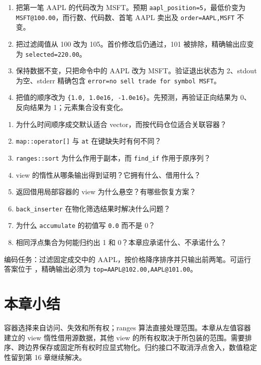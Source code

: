 \begin{enumerate}
  \item 把第一笔 AAPL 的代码改为 MSFT。预期 \texttt{aapl\_position=5}，最低价变为 \texttt{MSFT@100.00}，而行数、代码数、首笔 AAPL 卖出及 \texttt{order=AAPL,MSFT} 不变。
  \item 把过滤阈值从 100 改为 105。首价修改后仍通过，101 被排除，精确输出应变为 \texttt{selected=220.00}。
  \item 保持数据不变，只把命令中的 AAPL 改为 MSFT。验证退出状态为 2、stdout 为空、stderr 精确包含 \texttt{error=no sell trade for symbol MSFT}。
  \item 把值的顺序改为 \texttt{\{1.0, 1.0e16, -1.0e16\}}。先预测，再验证正向结果为 0、反向结果为 1；元素集合没有变化。
\end{enumerate}

\begin{enumerate}
  \item 为什么时间顺序成交默认适合 vector，而按代码仓位适合关联容器？
  \item \texttt{map::operator[]} 与 \texttt{at} 在键缺失时有何不同？
  \item \texttt{ranges::sort} 为什么作用于副本，而 \texttt{find\_if} 作用于原序列？
  \item view 的惰性从哪条输出得到证明？它拥有什么、借用什么？
  \item 返回借用局部容器的 view 为什么悬空？有哪些恢复方案？
  \item \texttt{back\_inserter} 在物化筛选结果时解决什么问题？
  \item 为什么 \texttt{accumulate} 的初值写 \texttt{0.0} 而不是 0？
  \item 相同浮点集合为何能归约出 1 和 0？本章应承诺什么、不承诺什么？
\end{enumerate}

编码任务：过滤固定成交中的 AAPL，按价格降序排序并只输出前两笔。可运行答案位于 ，精确输出必须为 \texttt{top=AAPL@102.00,AAPL@101.00}。


\section{本章小结}

容器选择来自访问、失效和所有权；ranges 算法直接处理范围。本章从左值容器建立的 view 惰性借用源数据，其他 view 的所有权取决于所包装的范围。需要排序、跨边界保存或固定所有权时应显式物化。归约接口不取消浮点舍入，数值稳定性留到第 16 章继续解决。
